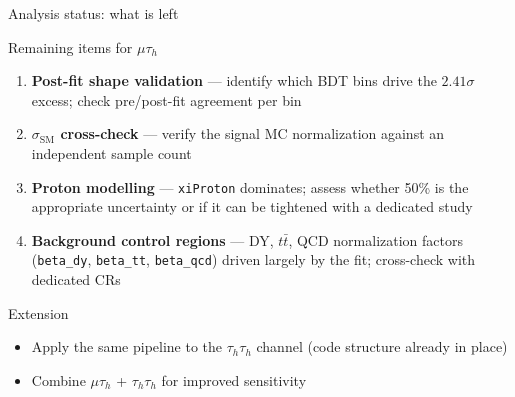 \begin{frame}[fragile]{Analysis status: what is left}
\protect{}\label{analysis-status-what-is-left}
\begin{block}{Remaining items for \(\mu\tau_h\)}
\protect{}\label{remaining-items-for-mutau_h}
\begin{enumerate}
\tightlist
\item
  \textbf{Post-fit shape validation} --- identify which BDT bins drive
  the \(2.41\sigma\) excess; check pre/post-fit agreement per bin
\item
  \textbf{\(\sigma_\text{SM}\) cross-check} --- verify the signal MC
  normalization against an independent sample count
\item
  \textbf{Proton modelling} --- \texttt{xiProton} dominates; assess
  whether 50\% is the appropriate uncertainty or if it can be tightened
  with a dedicated study
\item
  \textbf{Background control regions} --- DY, \(t\bar{t}\), QCD
  normalization factors (\texttt{beta\_dy}, \texttt{beta\_tt},
  \texttt{beta\_qcd}) driven largely by the fit; cross-check with
  dedicated CRs
\end{enumerate}
\end{block}

\begin{block}{Extension}
\protect{}\label{extension}
\begin{itemize}
\tightlist
\item
  Apply the same pipeline to the \(\tau_h\tau_h\) channel (code
  structure already in place)
\item
  Combine \(\mu\tau_h\) + \(\tau_h\tau_h\) for improved sensitivity
\end{itemize}
\end{block}
\end{frame}

